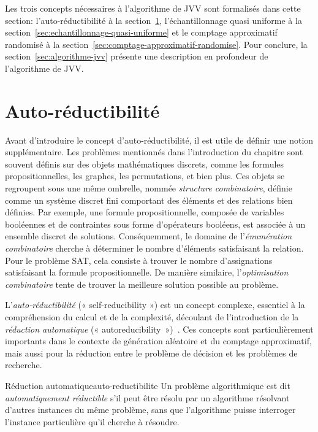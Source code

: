 Les trois concepts nécessaires à l'algorithme de JVV sont formalisés dans cette section: l'auto-réductibilité à la section~\ref{sec:auto-reductibilite}, l'échantillonnage quasi uniforme à la section~\ref{sec:echantillonnage-quasi-uniforme} et le comptage approximatif randomisé à la section~\ref{sec:comptage-approximatif-randomise}. Pour conclure, la section~\ref{sec:algorithme-jvv} présente une description en profondeur de l'algorithme de JVV.


\section{Auto-réductibilité}
\label{sec:auto-reductibilite}

Avant d'introduire le concept d'auto-réductibilité, il est utile de définir une notion supplémentaire. Les problèmes mentionnés dans l'introduction du chapitre sont souvent définis sur des objets mathématiques discrets, comme les formules propositionnelles, les graphes, les permutations, et bien plus. Ces objets se regroupent sous une même ombrelle, nommée \textit{structure combinatoire}, définie comme un système discret fini comportant des éléments et des relations bien définies. Par exemple, une formule propositionnelle, composée de variables booléennes et de contraintes sous forme d'opérateurs booléens, est associée à un ensemble discret de solutions. Conséquemment, le domaine de l'\textit{énumération combinatoire} cherche à déterminer le nombre d'éléments satisfaisant la relation. Pour le problème SAT, cela consiste à trouver le nombre d'assignations satisfaisant la formule propositionnelle. De manière similaire, l'\textit{optimisation combinatoire} tente de trouver la meilleure solution possible au problème.

L'\textit{auto-réductibilité} (« self-reducibility ») est un concept complexe, essentiel à la compréhension du calcul et de la complexité, découlant de l'introduction de la \textit{réduction automatique} (« autoreducibility »)~\cite{trakhtenbrotAutoreducibility1970, selkeAutoreducibilityFriendsMeasuring2006}. Ces concepts sont particulièrement importants dans le contexte de génération aléatoire et du comptage approximatif, mais aussi pour la réduction entre le problème de décision et les problèmes de recherche.

\begin{subdefinition}{Réduction automatique}{auto-reductibilite}
    Un problème algorithmique est dit \textit{automatiquement réductible} s'il peut être résolu par un algorithme résolvant d'autres instances du même problème, sans que l'algorithme puisse interroger l'instance particulière qu'il cherche à résoudre.
\end{subdefinition}

